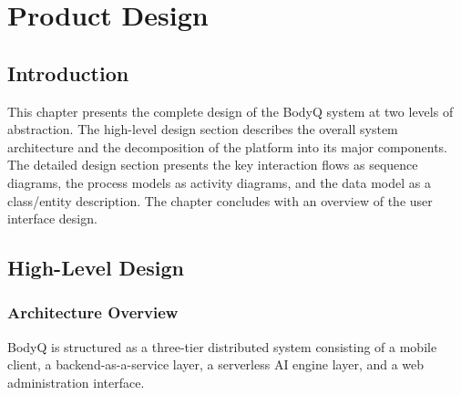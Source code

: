 
\chapter{Product Design}

\section{Introduction}
This chapter presents the complete design of the BodyQ system at two
levels of abstraction. The high-level design section describes the
overall system architecture and the decomposition of the platform into
its major components. The detailed design section presents the key
interaction flows as sequence diagrams, the process models as activity
diagrams, and the data model as a class/entity description. The chapter
concludes with an overview of the user interface design.

\section{High-Level Design}

\subsection{Architecture Overview}
BodyQ is structured as a three-tier distributed system consisting of a
mobile client, a backend-as-a-service layer, a serverless AI engine
layer, and a web administration interface.

